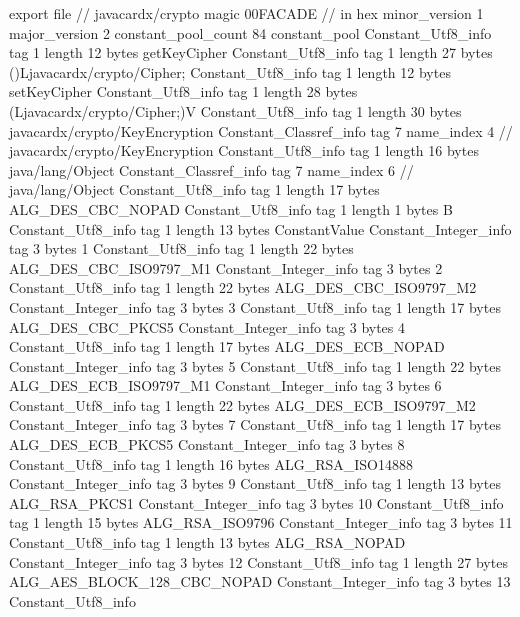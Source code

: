 export file {		// javacardx/crypto
	magic	00FACADE		 // in hex
	minor_version	1
	major_version	2
	constant_pool_count	84
	constant_pool {
		Constant_Utf8_info {
			tag	1
			length	12
			bytes	getKeyCipher
		}
		Constant_Utf8_info {
			tag	1
			length	27
			bytes	()Ljavacardx/crypto/Cipher;
		}
		Constant_Utf8_info {
			tag	1
			length	12
			bytes	setKeyCipher
		}
		Constant_Utf8_info {
			tag	1
			length	28
			bytes	(Ljavacardx/crypto/Cipher;)V
		}
		Constant_Utf8_info {
			tag	1
			length	30
			bytes	javacardx/crypto/KeyEncryption
		}
		Constant_Classref_info {
			tag	7
			name_index	4		// javacardx/crypto/KeyEncryption
		}
		Constant_Utf8_info {
			tag	1
			length	16
			bytes	java/lang/Object
		}
		Constant_Classref_info {
			tag	7
			name_index	6		// java/lang/Object
		}
		Constant_Utf8_info {
			tag	1
			length	17
			bytes	ALG_DES_CBC_NOPAD
		}
		Constant_Utf8_info {
			tag	1
			length	1
			bytes	B
		}
		Constant_Utf8_info {
			tag	1
			length	13
			bytes	ConstantValue
		}
		Constant_Integer_info {
			tag	3
			bytes	1
		}
		Constant_Utf8_info {
			tag	1
			length	22
			bytes	ALG_DES_CBC_ISO9797_M1
		}
		Constant_Integer_info {
			tag	3
			bytes	2
		}
		Constant_Utf8_info {
			tag	1
			length	22
			bytes	ALG_DES_CBC_ISO9797_M2
		}
		Constant_Integer_info {
			tag	3
			bytes	3
		}
		Constant_Utf8_info {
			tag	1
			length	17
			bytes	ALG_DES_CBC_PKCS5
		}
		Constant_Integer_info {
			tag	3
			bytes	4
		}
		Constant_Utf8_info {
			tag	1
			length	17
			bytes	ALG_DES_ECB_NOPAD
		}
		Constant_Integer_info {
			tag	3
			bytes	5
		}
		Constant_Utf8_info {
			tag	1
			length	22
			bytes	ALG_DES_ECB_ISO9797_M1
		}
		Constant_Integer_info {
			tag	3
			bytes	6
		}
		Constant_Utf8_info {
			tag	1
			length	22
			bytes	ALG_DES_ECB_ISO9797_M2
		}
		Constant_Integer_info {
			tag	3
			bytes	7
		}
		Constant_Utf8_info {
			tag	1
			length	17
			bytes	ALG_DES_ECB_PKCS5
		}
		Constant_Integer_info {
			tag	3
			bytes	8
		}
		Constant_Utf8_info {
			tag	1
			length	16
			bytes	ALG_RSA_ISO14888
		}
		Constant_Integer_info {
			tag	3
			bytes	9
		}
		Constant_Utf8_info {
			tag	1
			length	13
			bytes	ALG_RSA_PKCS1
		}
		Constant_Integer_info {
			tag	3
			bytes	10
		}
		Constant_Utf8_info {
			tag	1
			length	15
			bytes	ALG_RSA_ISO9796
		}
		Constant_Integer_info {
			tag	3
			bytes	11
		}
		Constant_Utf8_info {
			tag	1
			length	13
			bytes	ALG_RSA_NOPAD
		}
		Constant_Integer_info {
			tag	3
			bytes	12
		}
		Constant_Utf8_info {
			tag	1
			length	27
			bytes	ALG_AES_BLOCK_128_CBC_NOPAD
		}
		Constant_Integer_info {
			tag	3
			bytes	13
		}
		Constant_Utf8_info {
}}}
